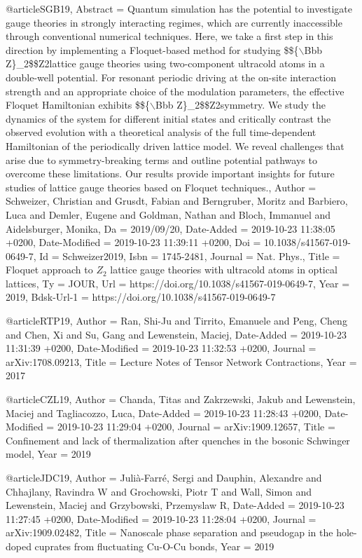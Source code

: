 \documentclass[epj,final]{svjour}
\begin{document}
@article{SGB19,
	Abstract = {Quantum simulation has the potential to investigate gauge theories in strongly interacting regimes, which are currently inaccessible through conventional numerical techniques. Here, we take a first step in this direction by implementing a Floquet-based method for studying {\$}{\$}{\{}{$\backslash$}Bbb Z{\}}{\_}2{\$}{\$}Z2lattice gauge theories using two-component ultracold atoms in a double-well potential. For resonant periodic driving at the on-site interaction strength and an appropriate choice of the modulation parameters, the effective Floquet Hamiltonian exhibits {\$}{\$}{\{}{$\backslash$}Bbb Z{\}}{\_}2{\$}{\$}Z2symmetry. We study the dynamics of the system for different initial states and critically contrast the observed evolution with a theoretical analysis of the full time-dependent Hamiltonian of the periodically driven lattice model. We reveal challenges that arise due to symmetry-breaking terms and outline potential pathways to overcome these limitations. Our results provide important insights for future studies of lattice gauge theories based on Floquet techniques.},
	Author = {Schweizer, Christian and Grusdt, Fabian and Berngruber, Moritz and Barbiero, Luca and Demler, Eugene and Goldman, Nathan and Bloch, Immanuel and Aidelsburger, Monika},
	Da = {2019/09/20},
	Date-Added = {2019-10-23 11:38:05 +0200},
	Date-Modified = {2019-10-23 11:39:11 +0200},
	Doi = {10.1038/s41567-019-0649-7},
	Id = {Schweizer2019},
	Isbn = {1745-2481},
	Journal = {Nat. Phys.},
	Title = {Floquet approach to {$Z_2$} lattice gauge theories with ultracold atoms in optical lattices},
	Ty = {JOUR},
	Url = {https://doi.org/10.1038/s41567-019-0649-7},
	Year = {2019},
	Bdsk-Url-1 = {https://doi.org/10.1038/s41567-019-0649-7}}

@article{RTP19,
	Author = {Ran, Shi-Ju and Tirrito, Emanuele and Peng, Cheng and Chen, Xi and Su, Gang and Lewenstein, Maciej},
	Date-Added = {2019-10-23 11:31:39 +0200},
	Date-Modified = {2019-10-23 11:32:53 +0200},
	Journal = {arXiv:1708.09213},
	Title = {Lecture Notes of Tensor Network Contractions},
	Year = {2017}}

@article{CZL19,
	Author = {Chanda, Titas and Zakrzewski, Jakub and Lewenstein, Maciej and Tagliacozzo, Luca},
	Date-Added = {2019-10-23 11:28:43 +0200},
	Date-Modified = {2019-10-23 11:29:04 +0200},
	Journal = {arXiv:1909.12657},
	Title = {Confinement and lack of thermalization after quenches in the bosonic Schwinger model},
	Year = {2019}}

@article{JDC19,
	Author = {Juli{\`a}-Farr{\'e}, Sergi and Dauphin, Alexandre and Chhajlany, Ravindra W and Grochowski, Piotr T and Wall, Simon and Lewenstein, Maciej and Grzybowski, Przemyslaw R},
	Date-Added = {2019-10-23 11:27:45 +0200},
	Date-Modified = {2019-10-23 11:28:04 +0200},
	Journal = {arXiv:1909.02482},
	Title = {Nanoscale phase separation and pseudogap in the hole-doped cuprates from fluctuating Cu-O-Cu bonds},
	Year = {2019}}
\end{document}
